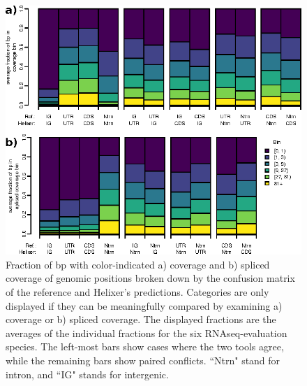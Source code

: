 \documentclass{article}
\begin{document}
\begin{figure}[!h]
\renewcommand\thefigure{S11}
\centerline{\includegraphics[]{images/cov_examples/average_vs_ref}}
\caption{
Fraction of bp with color-indicated a) coverage and b) spliced coverage of genomic positions
broken down by the confusion matrix of the reference and Helixer's predictions. Categories
are only displayed if they can be meaningfully compared by examining a) coverage or b) spliced
coverage. The displayed fractions are the averages of the individual fractions for the
six RNAseq-evaluation species. The left-most bars show cases where the two tools agree,
while the remaining bars show paired conflicts. ``Ntrn" stand
for intron, and ``IG" stands for intergenic.
}
\end{figure}
\end{document}
